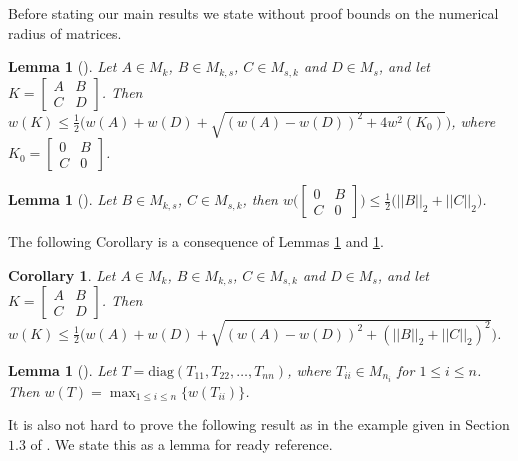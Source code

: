 \documentclass[12pt, reqno]{amsart}
\newtheorem{lemma}[theorem]{Lemma}
\newtheorem{corollary}[theorem]{Corollary}
\theoremstyle{definition}
\theoremstyle{remark}
\numberwithin{equation}{section}
\begin{document}
Before stating our main results we state without proof bounds on the numerical radius of matrices.

\begin{lemma}[\cite{Abu-Kittaneh}] \label{Lem-numerical radius-1}
Let $A \in M_k$, $B \in M_{k,s}$, $C \in M_{s,k}$ and $D \in M_{s}$, and 
let $K = \begin{bmatrix}
A & B \\
C & D
\end{bmatrix}$. Then 
$w(K) \leq \displaystyle \frac{1}{2} \Big(w(A)+ w(D) +\sqrt{(w(A)-w(D))^2+ 4w^2(K_0)}\Big)$,
where $K_0 = \begin{bmatrix}
0 & B \\
C & 0
\end{bmatrix}$. 
\end{lemma}

\begin{lemma}[\cite{Abu-Kittaneh}]\label{Lem-numerical radius-2}
Let $B \in M_{k,s}$, $C \in M_{s,k}$, then
$\displaystyle w\Bigg(\begin{bmatrix}
0 & B \\
C & 0
\end{bmatrix}\Bigg) \leq \frac{1}{2}\big(||B||_2+ ||C||_2 \big)$.
\end{lemma}

\medskip
\noindent
The following Corollary is a consequence of Lemmas \ref{Lem-numerical radius-1} and \ref{Lem-numerical radius-2}.

\begin{corollary}\label{Cor-numerical radius}
Let $A \in M_k$, $B \in M_{k,s}$, $C \in M_{s,k}$ and $D \in M_{s}$, and 
let $K = \begin{bmatrix}
A & B \\
C & D
\end{bmatrix}$. Then $w(K) \leq \displaystyle \frac{1}{2} \Big(w(A)+ w(D) +\sqrt{(w(A)-w(D))^2+ 
(||B||_2+||C||_2)^2} \Big)$.
\end{corollary}

\medskip
\begin{lemma} [\cite{R Bhatia}]\label{Lem-numerical radius-3}
Let $T = \text{diag}(T_{11}, T_{22}, \ldots, T_{nn})$, where $T_{ii} \in M_{n_i}$ for 
$1 \leq i \leq n$. Then $w(T) =\displaystyle \max_{1 \leq i \leq n}\{w(T_{ii})\}$.
\end{lemma}

It is also not hard to prove the following result as in the example given in Section $1.3$ of 
\cite{Gustafson-Rao}. We state this as a lemma for ready reference.
\end{document}
